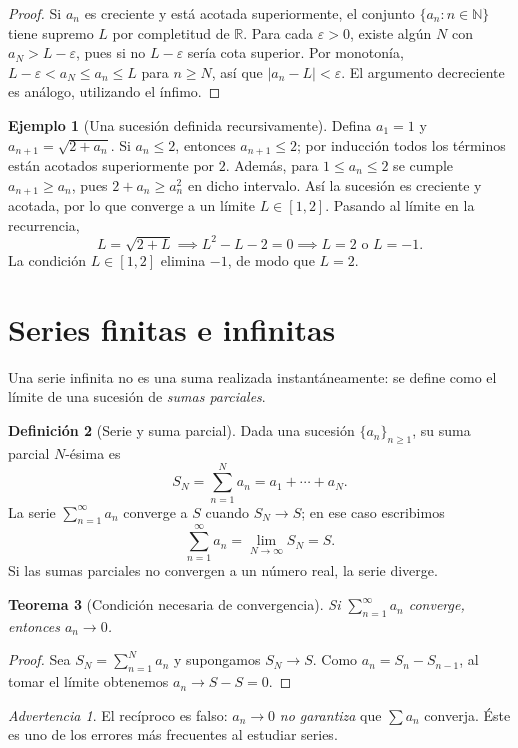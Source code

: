 \documentclass[12pt]{article}
\newtheorem{teorema}{Teorema}[section]
\theoremstyle{definition}
\newtheorem{definicion}[teorema]{Definición}
\newtheorem{ejemplo}[teorema]{Ejemplo}
\theoremstyle{remark}
\newtheorem*{advertencia}{Advertencia}
\newcommand{\R}{\mathbb{R}}
\begin{document}
\begin{proof}
Si $a_n$ es creciente y está acotada superiormente, el conjunto $\{a_n:n\in\mathbb N\}$ tiene supremo $L$ por completitud de $\R$. Para cada $\varepsilon>0$, existe algún $N$ con $a_N>L-\varepsilon$, pues si no $L-\varepsilon$ sería cota superior. Por monotonía, $L-\varepsilon<a_N\le a_n\le L$ para $n\ge N$, así que $|a_n-L|<\varepsilon$. El argumento decreciente es análogo, utilizando el ínfimo.
\end{proof}
\begin{ejemplo}[Una sucesión definida recursivamente]
Defina $a_1=1$ y $a_{n+1}=\sqrt{2+a_n}$. Si $a_n\le2$, entonces $a_{n+1}\le2$; por inducción todos los términos están acotados superiormente por $2$. Además, para $1\le a_n\le2$ se cumple $a_{n+1}\ge a_n$, pues $2+a_n\ge a_n^2$ en dicho intervalo. Así la sucesión es creciente y acotada, por lo que converge a un límite $L\in[1,2]$. Pasando al límite en la recurrencia,
\[L=\sqrt{2+L}\implies L^2-L-2=0\implies L=2\text{ o }L=-1.\]
La condición $L\in[1,2]$ elimina $-1$, de modo que $\boxed{L=2}$.
\end{ejemplo}

\section{Series finitas e infinitas}
Una serie infinita no es una suma realizada instantáneamente: se define como el límite de una sucesión de \emph{sumas parciales}.
\begin{definicion}[Serie y suma parcial]
Dada una sucesión $\{a_n\}_{n\ge1}$, su suma parcial $N$-ésima es
\[S_N=\sum_{n=1}^N a_n=a_1+\cdots+a_N.\]
La serie $\sum_{n=1}^{\infty}a_n$ converge a $S$ cuando $S_N\to S$; en ese caso escribimos
\[\boxed{\sum_{n=1}^{\infty}a_n=\lim_{N\to\infty}S_N=S.}\]
Si las sumas parciales no convergen a un número real, la serie diverge.
\end{definicion}
\begin{teorema}[Condición necesaria de convergencia]
Si $\sum_{n=1}^{\infty}a_n$ converge, entonces $a_n\to0$.
\end{teorema}
\begin{proof}
Sea $S_N=\sum_{n=1}^N a_n$ y supongamos $S_N\to S$. Como $a_n=S_n-S_{n-1}$, al tomar el límite obtenemos $a_n\to S-S=0$.
\end{proof}
\begin{advertencia}
El recíproco es falso: $a_n\to0$ \emph{no garantiza} que $\sum a_n$ converja. Éste es uno de los errores más frecuentes al estudiar series.
\end{advertencia}
\end{document}

